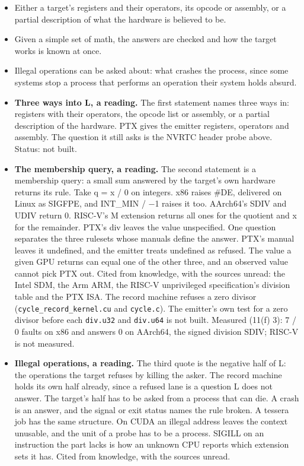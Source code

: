 \begin{enumerate}
\begin{itemize}
\begin{itemize}
\item Either a target's registers and their operators, its opcode or assembly, or a partial description of what the hardware is believed to be.
\item Given a simple set of math, the answers are checked and how the target works is known at once.
\item Illegal operations can be asked about: what crashes the process, since some systems stop a process that performs an operation their system holds absurd.
\item \textbf{Three ways into L, a reading.} The first statement names three ways in: registers with their operators, the opcode list or assembly, or a partial description of the hardware. PTX gives the emitter registers, operators and assembly. The question it still asks is the NVRTC header probe above. Status: not built.
\item \textbf{The membership query, a reading.} The second statement is a membership query: a small sum answered by the target's own hardware returns its rule. Take q = x / 0 on integers. x86 raises \#DE, delivered on Linux as SIGFPE, and INT\_\allowbreak{}MIN / −1 raises it too. AArch64's SDIV and UDIV return 0. RISC-V's M extension returns all ones for the quotient and x for the remainder. PTX's div leaves the value unspecified. One question separates the three rulesets whose manuals define the answer. PTX's manual leaves it undefined, and the emitter treats undefined as refused. The value a given GPU returns can equal one of the other three, and an observed value cannot pick PTX out. Cited from knowledge, with the sources unread: the Intel SDM, the Arm ARM, the RISC-V unprivileged specification's division table and the PTX ISA. The record machine refuses a zero divisor (\texttt{cycle\_\allowbreak{}record\_\allowbreak{}kernel.\allowbreak{}cu} and \texttt{cycle.\allowbreak{}c}). The emitter's own test for a zero divisor before each \texttt{div.\allowbreak{}u32} and \texttt{div.\allowbreak{}u64} is not built. Measured (11(f) 3): 7 / 0 faults on x86 and answers 0 on AArch64, the signed division SDIV; RISC-V is not measured.
\item \textbf{Illegal operations, a reading.} The third quote is the negative half of L: the operations the target refuses by killing the asker. The record machine holds its own half already, since a refused lane is a question L does not answer. The target's half has to be asked from a process that can die. A crash is an answer, and the signal or exit status names the rule broken. A tessera job has the same structure. On CUDA an illegal address leaves the context unusable, and the unit of a probe has to be a process. SIGILL on an instruction the part lacks is how an unknown CPU reports which extension sets it has. Cited from knowledge, with the sources unread.

\end{itemize}
\end{itemize}
\end{enumerate}
